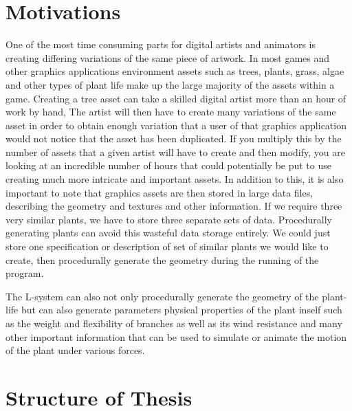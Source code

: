 \section{Motivations}
 
\begin{flushleft}

One of the most time consuming parts for digital artists and animators is creating differing variations of the same piece of artwork. In most games and other graphics applications environment assets such as trees, plants, grass, algae and other types of plant life make up the large majority of the assets within a game. Creating a tree asset can take a skilled digital artist more than an hour of work by hand, The artist will then have to create many variations of the same asset in order to obtain enough variation that a user of that graphics application would not notice that the asset has been duplicated. If you multiply this by the number of assets that a given artist will have to create and then modify, you are looking at an incredible number of hours that could potentially be put to use creating much more intricate and important assets. In addition to this, it is also important to note that graphics assets are then stored in large data files, describing the geometry and textures and other information. If we require three very similar plants, we have to store three separate sets of data. Procedurally generating plants can avoid this wasteful data storage entirely. We could just store one specification or description of set of similar plants we would like to create, then procedurally generate the geometry during the running of the program. \\

\vspace{5mm} 

The L-system can also not only procedurally generate the geometry of the plant-life but can also generate parameters physical properties of the plant inself such as the weight and flexibility of branches as well as its wind resistance and many other important information that can be used to simulate or animate the motion of the plant under various forces. \\

\end{flushleft}

\section{Structure of Thesis}

